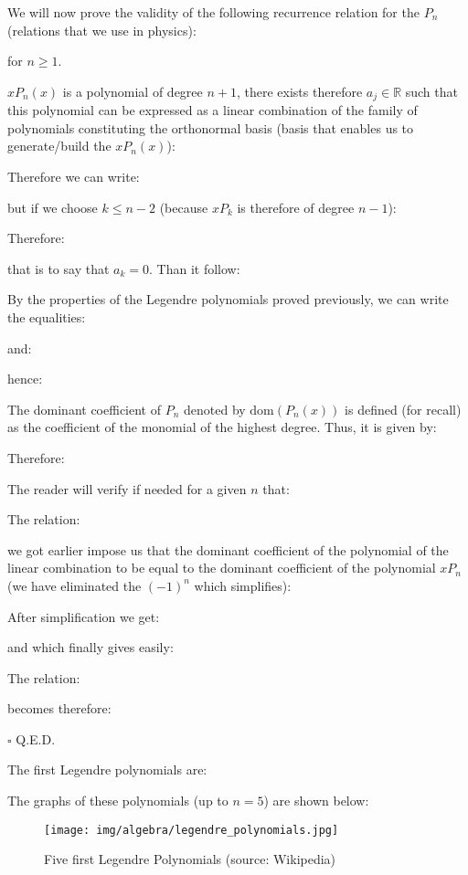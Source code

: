 	\begin{theorem}
	We will now prove the validity of the following recurrence relation for the $P_n$ (relations that we use in physics):
	
	for $n \geq 1$.
	\end{theorem}
	\begin{dem}
	$xP_n(x)$ is a polynomial of degree $n+1$, there exists therefore $a_j\in \mathbb{R}$ such that this polynomial can be expressed as a linear combination of the family of polynomials constituting the orthonormal basis (basis that enables us to generate/build the $xP_n(x)$):
	
	Therefore we can write:
	
	but if we choose $k\leq n-2$ (because $xP_k$ is therefore of degree $n-1$):
	
	Therefore:
	
	that is to say that $a_k=0$. Than it follow:
	
	By the properties of the Legendre polynomials proved previously, we can write the equalities:
	
	and:
	
	hence:
	
	The dominant coefficient of $P_n$ denoted by $\text{dom}(P_n(x))$ is defined (for recall) as the coefficient of the monomial of the highest degree. Thus, it is given by:
	
	Therefore:
	
	\begin{tcolorbox}[title=Remark,colframe=black,arc=10pt]
	The reader will verify if needed for a given $n$ that:
	
	\end{tcolorbox}
	The relation:
	
	we got earlier impose us that the dominant coefficient of the polynomial of the linear combination to be equal to the dominant coefficient of the polynomial $xP_n$ (we have eliminated the $(-1)^n$ which simplifies):
	
	After simplification we get:
	
	and which finally gives easily:
	
	The relation:
	
	becomes therefore:
		
	\begin{flushright}
		$\square$  Q.E.D.
	\end{flushright}
	\end{dem}
	The first Legendre polynomials are:
	

	The graphs of these polynomials (up to $n = 5$) are shown below:
	\begin{figure}[H]
		\centering
		\texttt{[image: img/algebra/legendre\_polynomials.jpg]}
		\caption[Five first Legendre Polynomials]{Five first Legendre Polynomials (source: Wikipedia)}
	\end{figure}
		

